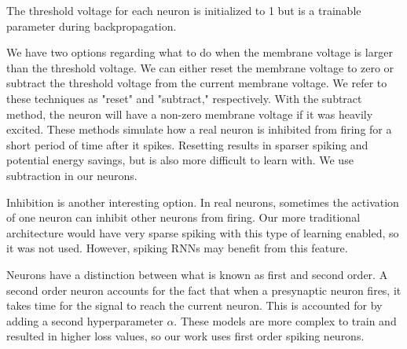 \documentclass[../taasin.tex]{subfiles}
\begin{document}
The threshold voltage for each neuron is initialized to 1 but is a trainable parameter during backpropagation.

We have two options regarding what to do when the membrane voltage is larger than the threshold voltage. We can either reset the membrane voltage to zero or subtract the threshold voltage from the current membrane voltage. We refer to these techniques as "reset" and "subtract," respectively. With the subtract method, the neuron will have a non-zero membrane voltage if it was heavily excited. These methods simulate how a real neuron is inhibited from firing for a short period of time after it spikes. Resetting results in sparser spiking and potential energy savings, but is also more difficult to learn with. We use subtraction in our neurons.

Inhibition is another interesting option. In real neurons, sometimes the activation of one neuron can inhibit other neurons from firing. Our more traditional architecture would have very sparse spiking with this type of learning enabled, so it was not used. However, spiking RNNs may benefit from this feature.

Neurons have a distinction between what is known as first and second order. A second order neuron accounts for the fact that when a presynaptic neuron fires, it takes time for the signal to reach the current neuron. This is accounted for by adding a second hyperparameter $\alpha$. These models are more complex to train and resulted in higher loss values, so our work uses first order spiking neurons.

\end{document}
